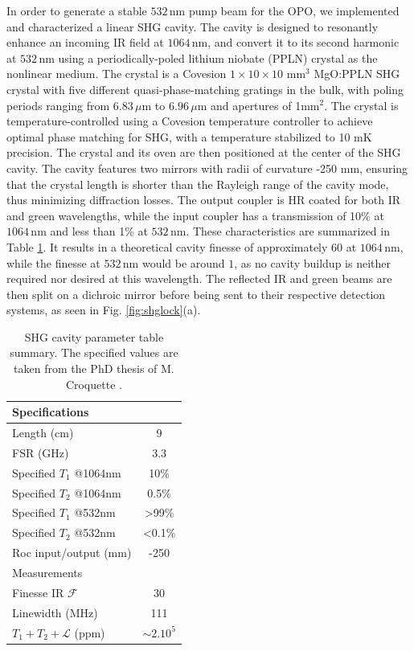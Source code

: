 In order to generate a stable $532\,\mathrm{nm}$ pump beam for the OPO, we implemented and characterized a linear SHG cavity. The cavity is designed to resonantly enhance an incoming IR field at $1064\,\mathrm{nm}$, and convert it to its second harmonic at $532\,\mathrm{nm}$ using a periodically-poled lithium niobate (PPLN) crystal as the nonlinear medium. The crystal is a Covesion $1\times10\times10$ mm$^3$ MgO:PPLN SHG crystal with five different quasi-phase-matching gratings in the bulk, with poling periods ranging from $6.83\,\mu\mathrm{m}$ to $6.96\,\mu\mathrm{m}$ and apertures of 1mm$^2$. The crystal is temperature-controlled using a Covesion temperature controller to achieve optimal phase matching for SHG, with a temperature stabilized to 10 mK precision. The crystal and its oven are then positioned at the center of the SHG cavity. The cavity features two mirrors with radii of curvature -250 mm, ensuring that the crystal length is shorter than the Rayleigh range of the cavity mode, thus minimizing diffraction losses. The output coupler is HR coated for both IR and green wavelengths, while the input coupler has a transmission of 10\% at $1064\,\mathrm{nm}$ and less than 1\% at $532\,\mathrm{nm}$. These characteristics are summarized in Table \ref{tab:SHG params}. It results in a theoretical cavity finesse of approximately $60$ at $1064 \, \text{nm}$, while the finesse at $532 \, \text{nm}$ would be around $1$, as no cavity buildup is neither required nor desired at this wavelength. The reflected IR and green beams are then split on a dichroic mirror before being sent to their respective detection systems, as seen in Fig. \ref{fig:shglock}(a). \\ 

\begin{table}[t!]
    \centering
    \captionsetup{width=0.55\linewidth}
    \begin{tabular}{lc}
        Specifications &  \\
        \hline
        Length (cm)              & 9 \\
        FSR (GHz)                  &  3.3\\
        Specified $T_1$ @1064nm & 10\% \\
        Specified $T_2$ @1064nm & 0.5\% \\
        Specified $T_1$ @532nm & >99\% \\
        Specified $T_2$ @532nm & <0.1\% \\
        Roc input/output (mm) & -250 \\[0.6em]
        Measurements &  \\
        \hline
        Finesse IR $\mathcal{F}$& 30 \\
        Linewidth (MHz)            & 111  \\ 
        $T_1 + T_2 + \mathcal{L}$ (ppm) & $\sim 2.10^5$  \\
    \end{tabular}
    \caption{SHG cavity parameter table summary. The specified values are taken from the PhD thesis of M. Croquette \cite{croquette}.}
    \label{tab:SHG params}
\end{table}

